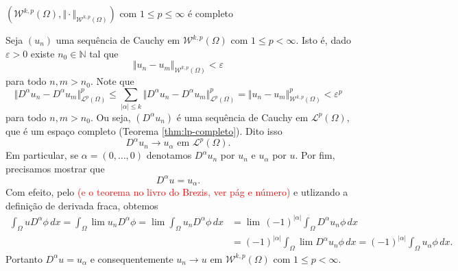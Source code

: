 \documentclass[a4paper, 11pt]{book}
\theoremstyle{definition}
\newcommand{\bN}{\mathbb{N}}
\newcommand{\cL}{\mathcal{L}}
\newcommand{\cW}{\mathcal{W}}
\begin{document}
\begin{tbox}
    $(\cW^{k,p}(\Omega), \Vert \cdot \Vert_{\cW^{k,p}(\Omega)})$ com $1 \leqslant p \leqslant \infty$ é completo
\end{tbox}
\begin{prf}
    Seja $(u_n)$ uma sequência de Cauchy em $\cW^{k,p}(\Omega)$ com $1 \leqslant p < \infty$. Isto é, dado $\varepsilon > 0$ existe $n_0 \in \bN$ tal que
    \[
        \Vert u_n - u_m \Vert_{\cW^{k,p}(\Omega)} < \varepsilon
    \]
    para todo $n,m > n_0$.
    Note que
    \[
        \Vert D^\alpha u_n - D^\alpha u_m \Vert_{\cL^p(\Omega)}^p \leqslant \sum_{|\alpha| \leqslant k} \Vert D^\alpha u_n - D^\alpha u_m \Vert_{\cL^p(\Omega)}^p = \Vert u_n - u_m \Vert_{\cW^{k,p}(\Omega)}^p < \varepsilon^p
    \]
    para todo $n,m > n_0$. Ou seja, $(D^\alpha u_n)$ é uma sequência de Cauchy em $\cL^p(\Omega)$, que é um espaço completo (Teorema \ref{thm:lp-completo}). 
    Dito isso
    \[
        D^\alpha u_n \to u_\alpha \text{ em } \cL^p(\Omega).
    \]
    Em particular, se $\alpha = (0,\dots,0)$ denotamos $D^\alpha u_n$ por $u_n$ e $u_\alpha$ por $u$.
    Por fim, precisamos mostrar que
    \[
        D^\alpha u = u_\alpha.
    \]
    Com efeito, pelo  \textcolor{red}{(e o teorema no livro do Brezis, ver pág e número)} e utlizando a definição de derivada fraca, obtemos
    \[
        \begin{aligned}
            \int_\Omega u D^\alpha \phi \, dx 
            = \int_\Omega \lim u_n D^\alpha \phi 
            = \lim\! \int_\Omega u_n D^\alpha \phi \,dx
            &= \lim\, (-1)^{|\alpha|}\!\int_\Omega  D^\alpha u_n \phi\,dx \\
            &= (-1)^{|\alpha|}\!\int_\Omega \lim D^\alpha u_n \phi \,dx 
            = (-1)^{|\alpha|}\!\int_\Omega u_\alpha \phi \,dx.
        \end{aligned}
    \]
    Portanto $D^\alpha u = u_\alpha$ e consequentemente $u_n \to u$ em $\cW^{k,p}(\Omega)$ com $1 \leqslant p < \infty$.


\end{prf}
\end{document}
